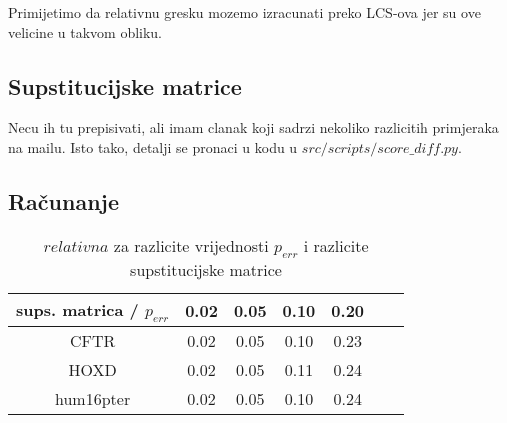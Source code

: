 \documentclass[11pt]{article} %
\begin{document}
Primijetimo da relativnu gresku mozemo izracunati preko LCS-ova jer su ove velicine u takvom obliku.

\subsection{Supstitucijske matrice}

Necu ih tu prepisivati, ali imam clanak  koji sadrzi nekoliko razlicitih primjeraka na mailu. Isto tako, detalji se pronaci u kodu u $src/scripts/score\_diff.py$.

\subsection{Ra\v{c}unanje}

\begin{table}[H]
\centering
\begin{tabular}{|c||c|c|c|c|c|c|}
\hline
	sups. matrica / $p_{err}$ & 0.02 & 0.05 & 0.10 & 0.20\\
\hline
\hline
	CFTR & 0.02 & 0.05 & 0.10 & 0.23 \\
\hline
	HOXD & 0.02 & 0.05 & 0.11 & 0.24\\
\hline
	hum16pter & 0.02 & 0.05 & 0.10 & 0.24\\
\hline
\end{tabular}
\caption{$relativna$ za razlicite vrijednosti $p_{err}$ i razlicite supstitucijske matrice}
\end{table}
\end{document}
